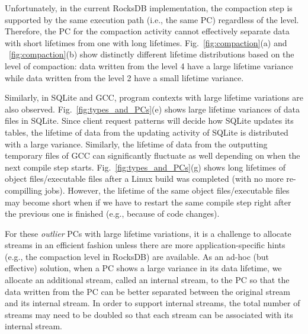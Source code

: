 Unfortunately, in the current RocksDB implementation, the compaction step is supported 
by the same execution path (i.e., the same PC) regardless of the level.
Therefore, the PC for the compaction activity cannot effectively separate data with 
short lifetimes from one with long lifetimes.
Fig.~\ref{fig:compaction}(a) and ~\ref{fig:compaction}(b) show
distinctly different lifetime distributions based on the level of compaction:
data written from the level 4 have a large lifetime variance while data written from
the level 2 have a small lifetime variance.

Similarly, in SQLite and GCC, program contexts with large lifetime variations
are also observed.
Fig.~\ref{fig:types_and_PCs}(e) shows large lifetime variances of data files in
SQLite.
Since client request patterns will decide how SQLite updates its tables, 
the lifetime of data from the updating activity of SQLite is distributed 
with a large variance.  Similarly, the lifetime of
data from the outputting temporary files of GCC can significantly fluctuate 
as well depending on when the next compile step starts.   
Fig.~\ref{fig:types_and_PCs}(g) shows long lifetimes of 
object files/executable files after 
a Linux build was completed
(with no more re-compilling jobs).
However, the lifetime of the same object files/executable files 
may become short when if we have to restart the same
compile step right after the previous one is finished
(e.g., because of code changes).

For these {\it outlier} PCs with large lifetime variations, 
it is a challenge to allocate streams in an efficient fashion unless 
there are more application-specific hints (e.g., the compaction level in
RocksDB) are available.  
As an ad-hoc (but effective) solution, when a PC shows a large variance 
in its data lifetime, we allocate an additional stream, called an internal stream, 
to the PC so that
the data written from the PC can be better separated between the original 
stream and its internal stream.  
In order to support internal streams, the total number of streams may 
need to be doubled so
that each stream can be associated with its internal stream.

\vspace{-10pt}
